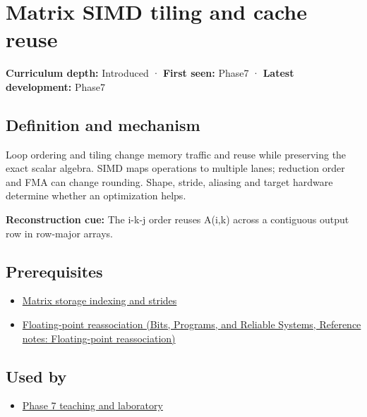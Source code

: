\hypertarget{appendix-1bfb7c657105}{}\label{referencestart:appendix-1bfb7c657105}
\section{Matrix SIMD tiling and cache reuse}\label{appendix-1bfb7c657105-matrix-simd-tiling-and-cache-reuse}

\textbf{Curriculum depth:} Introduced · \textbf{First seen:} Phase7 · \textbf{Latest development:} Phase7

\subsection{Definition and mechanism}\label{appendix-1bfb7c657105-definition-and-mechanism}

Loop ordering and tiling change memory traffic and reuse while preserving the exact scalar algebra. SIMD maps operations to multiple lanes; reduction order and FMA can change rounding. Shape, stride, aliasing and target hardware determine whether an optimization helps.

\textbf{Reconstruction cue:} The i-k-j order reuses A(i,k) across a contiguous output row in row-major arrays.

\subsection{Prerequisites}\label{appendix-1bfb7c657105-prerequisites}

\begin{itemize}
\tightlist
\item
  \hyperref[appendix-ffdc1d4e5350]{Matrix storage indexing and strides}
\item
  \href{../01-Bits-Programs-and-Reliable-Systems/main.pdf\#nameddest=appendix-c2ac4a84c283}{Floating-point reassociation (Bits, Programs, and Reliable Systems, Reference notes: Floating-point reassociation)}
\end{itemize}

\subsection{Used by}\label{appendix-1bfb7c657105-used-by}

\begin{itemize}
\tightlist
\item
  \hyperref[01-foundations-i-ch018-keep-the-promises-visible-while-moving-between-representations]{Phase 7 teaching and laboratory}
\end{itemize}

